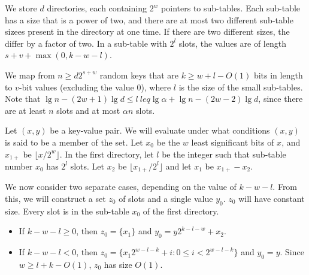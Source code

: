 \documentclass[11pt,letterpaper]{article}
\begin{document}
We store $d$ directories, each containing $2^w$ pointers to sub-tables.
Each sub-table has a size that is a power of two, and there are at most two different sub-table sizees present in the directory at one time.
If there are two different sizes, the differ by a factor of two.
In a sub-table with $2^l$ slots, the values are of length $s + v + \max(0,k - w - l)$.

We map from $n \geq d 2^{s+w}$ random keys that are $k \geq w + l - O(1)$ bits in length to $v$-bit values (excluding the value $0$), where $l$ is the size of the small sub-tables.
Note that $\lg n - (2w + 1) \lg d \leq l \ leq \lg \alpha + \lg n - (2w - 2)\lg d$, since there are at least $n$ slots and at most $\alpha n$ slots.


Let $(x,y)$ be a key-value pair.
We will evaluate under what conditions $(x,y)$ is said to be a member of the set.
Let $x_0$ be the $w$ least significant bits of $x$, and $x_{1+}$ be $\lfloor x / 2^w \rfloor$.
In the first directory, let $l$ be the integer such that sub-table number $x_0$ has $2^l$ slots.
Let $x_2$ be $\lfloor x_{1+} / 2^l \rfloor$ and let $x_1$ be $x_{1+} - x_2$.

We now consider two separate cases, depending on the value of $k - w - l$.
From this, we will construct a set $z_0$ of slots and a single value $y_0$.
$z_0$ will have constant size.
Every slot is in the sub-table $x_0$ of the first directory.

\begin{itemize}
\item If $k - w - l \geq 0$, then $z_0 = \{x_1\}$ and $y_0 = y 2^{k - l - w} + x_2$.
\item If $k - w - l < 0$, then $z_0 = \{x_1 2^{w - l - k} + i : 0 \leq i < 2^{w-l-k}\}$ and $y_0 = y$.
  Since $w \geq l + k - O(1)$, $z_0$ has size $O(1)$.
\end{itemize}
\end{document}
